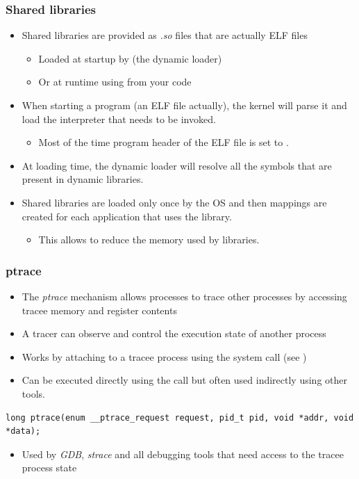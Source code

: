 \begin{frame}
  \frametitle{Shared libraries}
  \begin{itemize}
    \item Shared libraries are provided as {\em .so} files that are actually ELF files
    \begin{itemize}
      \item Loaded at startup by  (the dynamic loader)
      \item Or at runtime using  from your code
    \end{itemize}
    \item When starting a program (an ELF file actually), the kernel will
          parse it and load the interpreter that needs to be invoked.
    \begin{itemize}
      \item Most of the time  program header of the ELF file is
            set to .
    \end{itemize}
    \item At loading time, the dynamic loader  will resolve all the
          symbols that are present in dynamic libraries.
    \item Shared libraries are loaded only once by the OS and then mappings are
          created for each application that uses the library.
    \begin{itemize}
      \item This allows to reduce the memory used by libraries.
    \end{itemize}
  \end{itemize}
\end{frame}

\begin{frame}[fragile]
  \frametitle{ptrace}
  \begin{itemize}
    \item The {\em ptrace} mechanism allows processes to trace other processes by
          accessing tracee memory and register contents
    \item A tracer can observe and control the execution state of another
          process
    \item Works by attaching to a tracee process using the 
          system call (see )
    \item Can be executed directly using the  call but often used
          indirectly using other tools.
  \end{itemize}

  \begin{block}{}
    \begin{verbatim}
long ptrace(enum __ptrace_request request, pid_t pid, void *addr, void *data);
    \end{verbatim}
  \end{block}

  \begin{itemize}
    \item Used by {\em GDB}, {\em strace} and all debugging tools that need access to the
          tracee process state
  \end{itemize}
\end{frame}


